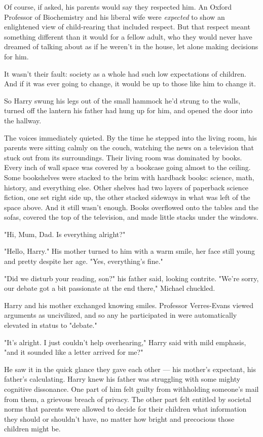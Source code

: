 Of course, if asked, his parents would say they respected
him. An Oxford Professor of Biochemistry and his liberal
wife were \emph{expected} to show an enlightened view of
child-rearing that included respect. But that respect meant
something different than it would for a fellow adult, who
they would never have dreamed of talking about as if he
weren't in the house, let alone making decisions for him.

It wasn't their fault: society as a whole had such low
expectations of children. And if it was ever going to
change, it would be up to those like him to change it.

So Harry swung his legs out of the small hammock he'd
strung to the walls, turned off the lantern his father had
hung up for him, and opened the door into the hallway.

The voices immediately quieted. By the time he stepped
into the living room, his parents were sitting calmly on the
couch, watching the news on a television that stuck out
from its surroundings. Their living room was
dominated by books. Every inch of wall space was covered
by a bookcase going almost to the ceiling. Some
bookshelves were stacked to the brim with hardback
books: science, math, history, and everything else. Other
shelves had two layers of paperback science fiction, one
set right side up, the other stacked sideways in what was left
of the space above. And it still wasn't enough. Books 
overflowed onto the tables and the sofas, covered the top
of the television, and made little stacks under the windows.

"Hi, Mum, Dad. Is everything alright?"

"Hello, Harry." His mother turned to him with a warm
smile, her face still young and pretty despite her age. "Yes,
everything's fine."

"Did we disturb your reading, son?" his father said, looking
contrite. "We're sorry, our debate got a bit passionate at
the end there," Michael chuckled.

Harry and his mother exchanged knowing smiles. Professor
Verres-Evans viewed arguments as uncivilized, and so any
he participated in were automatically elevated in status to
"debate."

"It's alright. I just couldn't help overhearing,"
Harry said with mild emphasis, "and it sounded like a letter
arrived for me?"

He saw it in the quick glance they gave each other --- his
mother's expectant, his father's calculating. Harry knew his
father was struggling with some mighty cognitive
dissonance. One part of him felt guilty from withholding
someone's mail from them, a grievous breach of privacy.
The other part felt entitled by societal norms that parents
were allowed to decide for their children what information
they should or shouldn't have, no matter how bright and
precocious those children might be.

